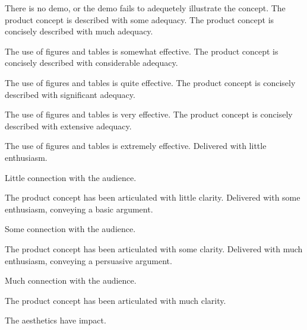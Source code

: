 \documentclass{../../fal_assignment}
\begin{document}
\begin{markingrubric}
%
        \grade\fail There is no demo, or the demo fails to adequetely illustrate the concept.
        \grade The product concept is described with some adequacy.
        \grade The product concept is concisely described with much adequacy.
            \par The use of figures and tables is somewhat effective.
        \grade The product concept is concisely described with considerable adequacy.
            \par The use of figures and tables is quite effective.
        \grade The product concept is concisely described with significant adequacy.
            \par The use of figures and tables is very effective.
        \grade The product concept is concisely described with extensive adequacy.
            \par The use of figures and tables is extremely effective.
%
        \grade \fail Delivered with little enthusiasm. 
            \par Little connection with the audience.
            \par The product concept has been articulated with little clarity.
        \grade Delivered with some enthusiasm, conveying a basic argument. 
            \par Some connection with the audience.
            \par The product concept has been articulated with some clarity.
        \grade Delivered with much enthusiasm, conveying a persuasive argument. 
            \par Much connection with the audience.
            \par The product concept has been articulated with much clarity.
            \par The aesthetics have impact.

\end{markingrubric}
\end{document}
